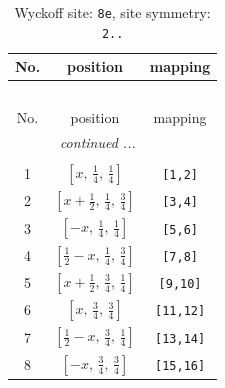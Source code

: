 \documentclass[fleqn,8pt]{jsarticle}
\begin{document}
\begin{longtable}{ccc}
\caption{Wyckoff site: {\tt 8e}, site symmetry: {\tt 2..}}
 \\
 \hline \hline
No. & position & mapping \\ \hline \endfirsthead

\multicolumn{2}{l}{\tablename\ \thetable{}} \\
 \hline \hline
No. & position & mapping \\ \hline \endhead

 \hline \hline
\multicolumn{2}{r}{\footnotesize\it continued ...} \\ \endfoot

 \hline \hline
\multicolumn{2}{r}{} \\ \endlastfoot

1 & $\left[ x,\, \frac{1}{4},\, \frac{1}{4} \right]$ & {\tt [1,2]} \\ \hline
2 & $\left[ x + \frac{1}{2},\, \frac{1}{4},\, \frac{3}{4} \right]$ & {\tt [3,4]} \\ \hline
3 & $\left[ - x,\, \frac{1}{4},\, \frac{1}{4} \right]$ & {\tt [5,6]} \\ \hline
4 & $\left[ \frac{1}{2} - x,\, \frac{1}{4},\, \frac{3}{4} \right]$ & {\tt [7,8]} \\ \hline
5 & $\left[ x + \frac{1}{2},\, \frac{3}{4},\, \frac{1}{4} \right]$ & {\tt [9,10]} \\ \hline
6 & $\left[ x,\, \frac{3}{4},\, \frac{3}{4} \right]$ & {\tt [11,12]} \\ \hline
7 & $\left[ \frac{1}{2} - x,\, \frac{3}{4},\, \frac{1}{4} \right]$ & {\tt [13,14]} \\ \hline
8 & $\left[ - x,\, \frac{3}{4},\, \frac{3}{4} \right]$ & {\tt [15,16]} \\
\end{longtable}
\renewcommand{\arraystretch}{1.2}
\end{document}

